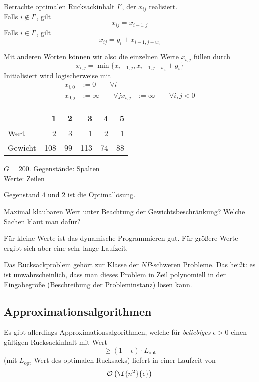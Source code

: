 \documentclass[11pt]{scrbook}
\renewcommand{\O}{\mathcal{O}}
\begin{document}
Betrachte optimalen Rucksackinhalt $I'$, der $x_{ij}$ realisiert.\\
Falls $i\not\in I'$, gilt 
\[
	x_{ij}= x_{i-1,j}
\]
Falls $i\in I'$, gilt 
\[
	x_{ij} = g_i + x_{i-1,j-w_i}
\]

Mit anderen Worten können wir also die einzelnen Werte $x_{i,j}$ füllen durch
\[
	x_{i,j} = \min\{x_{i-1,j}, x_{i-1,j-w_i} + g_i\}
\]
Initialisiert wird logischerweise mit
\begin{align*}
	x_{i,0} &:= 0 \qquad \forall i\\
	x_{0,j} &:= \infty \qquad \forall j
	x_{i,j} &:= \infty \qquad \forall i,j < 0
\end{align*}

\begin{ex}
	\begin{tabular}{l|rrrrr}
		~ & 1 & 2 & 3 & 4 & 5 \\
		\hline
		Wert&2 & 3 & 1 & 2 & 1\\
		Gewicht&108 & 99 & 113 & 74 & 88
	\end{tabular}
	$G=200$.
	Gegenstände: Spalten\\
	Werte: Zeilen

	Gegenstand $4$ und $2$ ist die Optimallösung.

\end{ex}

Maximal klaubaren Wert unter Beachtung der Gewichtsbeschränkung?
Welche Sachen klaut man dafür? 

\begin{note}
	Für kleine Werte ist das dynamische Programmieren gut.
	Für größere Werte ergibt sich aber eine sehr lange Laufzeit.
\end{note}

Das Rucksackproblem gehört zur Klasse der $NP$-schweren Probleme.
Das heißt: es ist unwahrscheinlich, dass man dieses Problem in Zeil polynomiell in der Eingabegröße (Beschreibung der Probleminstanz) lösen kann.


\subsection{Approximationsalgorithmen}

Es gibt allerdings Approximationsalgorithmen, welche für \emph{beliebiges} $\epsilon > 0$ einen gültigen Rucksackinhalt mit Wert
\[
	\ge (1-\epsilon)\cdot L_{\text{opt}}
\]
(mit $L_{\text{opt}}$ Wert des optimalen Rucksacks)
liefert in einer Laufzeit von
\[
	\O\left( \f{n^2}{\epsilon}\right)
\]
\end{document}
